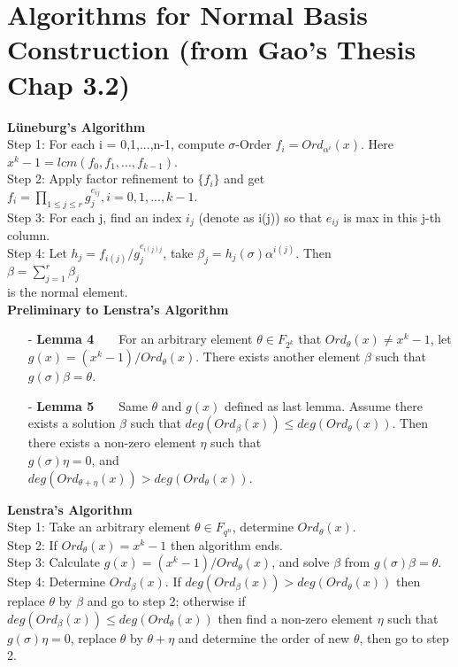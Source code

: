 \documentclass[12pt]{article}
\begin{document}
\section{Algorithms for Normal Basis Construction (from Gao's Thesis Chap 3.2)}
\textbf{L\"uneburg's Algorithm}\\
Step 1: For each i = 0,1,...,n-1, compute $\sigma$-Order $f_i = Ord_{\alpha^i}(x)$. Here $x^k - 1 = lcm(f_0,f_1,...,f_{k-1})$.\\
Step 2: Apply factor refinement to $\{f_i\}$ and get $f_i = \prod_{1\leq j\leq r} g_{j}^{e_{ij}}, i = 0,1,...,k-1$.\\
Step 3: For each j, find an index $i_j$ (denote as i(j)) so that $e_{ij}$ is max in this j-th column.\\
Step 4: Let $h_j = f_{i(j)}/g_{j}^{e_{i(j)j}}$, take $\beta_j = h_j(\sigma)\alpha^{i(j)}$. Then\\
\indent\indent\indent\indent\indent\indent\indent\indent\indent$\beta = \displaystyle\sum_{j=1}^{r} \beta_j$\\
is the normal element.\\

\textbf{Preliminary to Lenstra's Algorithm}
\begin{itemize}
\item[-] \textbf{Lemma 4}\ \ \ \ For an arbitrary element $\theta \in F_{2^k}$ that $Ord_\theta(x) \neq x^k - 1$,
let $g(x) = (x^k - 1)/Ord_\theta(x)$. There exists another element $\beta$ such that $g(\sigma)\beta = \theta$.\
\item[-] \textbf{Lemma 5}\ \ \ \ Same $\theta$ and $g(x)$ defined as last lemma. Assume there exists a solution 
$\beta$ such that $deg(Ord_\beta(x)) \leq deg(Ord_\theta(x))$. Then there exists a non-zero element $\eta$ such that\\
$g(\sigma)\eta = 0$, and\\
$deg(Ord_{\theta+\eta}(x)) > deg(Ord_\theta(x))$.\\

\end{itemize} 

\textbf{Lenstra's Algorithm}\\
Step 1: Take an arbitrary element $\theta \in F_{q^n}$, determine $Ord_\theta(x)$.\\
Step 2: If $Ord_\theta(x) = x^k - 1$ then algorithm ends.\\
Step 3: Calculate $g(x) = (x^k - 1)/Ord_\theta(x)$, and solve $\beta$ from $g(\sigma)\beta = \theta$.\\
Step 4: Determine $Ord_\beta(x)$. If $deg(Ord_\beta(x)) > deg(Ord_\theta(x))$ then replace $\theta$ by $\beta$ and go to step 2;
	otherwise if $deg(Ord_\beta(x)) \leq deg(Ord_\theta(x))$ then find a non-zero element $\eta$ such that $g(\sigma)\eta = 0$,
	replace $\theta$ by $\theta + \eta$ and determine the order of new $\theta$, then go to step 2.\\
\end{document}
